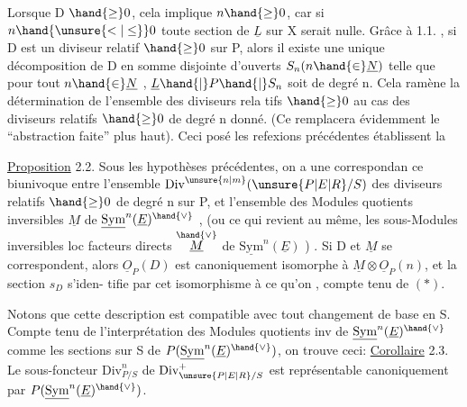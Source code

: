 
Lorsque D $\hand{\geq} 0$, cela implique $n \hand{\geq} 0$, car si  $n \hand{\unsure{<|\leq}} 0$ toute section de
$\underline{L}$ sur X serait nulle. Grâce à 1.1. , si D est un diviseur relatif
$\hand{\geq} 0$ sur P, alors il existe une unique décomposition de D en somme
disjointe d'ouverts $S_n (n \hand{\in} \underline{N})$ telle que pour tout $n \hand{\in} \underline{N}$ , $\underline{L}\hand{|}P\hand{|}S_n$ soit de
degré n. Cela ramène la détermination de l'ensemble des diviseurs rela%
tifs $\hand{\geq} 0$ au cas des diviseurs relatifs $\hand{\geq} 0$ de degré n donné. (Ce
\margin{$/\!/$}  remplacera évidemment le ``abstraction faite'' plus haut). Ceci posé
les refexions précédentes établissent la

\uline{Proposition} 2.2. Sous les hypothèses précédentes, on a une correspondan%
ce biunivoque entre l'ensemble $\mathrm{Div}^{\unsure{n|m}}(\unsure{P|E|R}/S)$ des diviseurs relatifs $\hand{\geq} 0$ de
degré n sur P, et l'ensemble des Modules quotients inversibles $\underline{M}$ de
$\underline{\mathrm{Sym}}^{n}(\underline{E})^{\hand{\vee}}$ , (ou ce qui revient au même, les sous-Modules inversibles loc
facteurs directs $\overset{\hand{\vee}}{\underline{M}}$ de $\underline{\mathrm{Sym}}^{n}(\underline{E})$ ) . Si D et $\underline{M}$ se correspondent, alors
$\underline{O}_P(D)$ est canoniquement isomorphe à $\underline{M}\otimes\underline{O}_P(n)$, et la section $s_D$ s'iden-%
tifie par cet isomorphisme à ce qu'on , compte tenu de $(*)$.

Notons que cette description est compatible avec tout changement de
base en S. Compte tenu de l'interprétation des Modules quotients inv de
$\underline{\mathrm{Sym}}^{n}(\underline{E})^{\hand{\vee}}$ comme les sections sur S de $P(\underline{\mathrm{Sym}}^{n}(\underline{E})^{\hand{\vee}})$, on trouve ceci:
\uline{Corollaire} 2.3. Le sous-foncteur  $\mathrm{Div}^{n}_{P/S}$ de $\mathrm{Div}^{+}_{\unsure{P|E|R}/S}$ est représentable
canoniquement par $P(\underline{\mathrm{Sym}}^{n}(\underline{E})^{\hand{\vee}})$.

